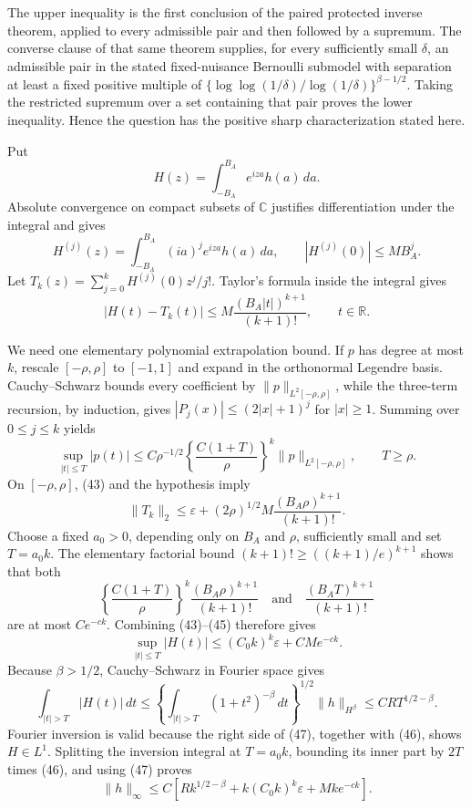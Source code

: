 The upper inequality is the first conclusion of the paired protected inverse theorem, applied to every admissible pair and then followed by a supremum.  The converse clause of that same theorem supplies, for every sufficiently small \(\delta\), an admissible pair in the stated fixed-nuisance Bernoulli submodel with separation at least a fixed positive multiple of \(\{\log\log(1/\delta)/\log(1/\delta)\}^{\beta-1/2}\).  Taking the restricted supremum over a set containing that pair proves the lower inequality.  Hence the question has the positive sharp characterization stated here.

Put
\[
H(z)=\int_{-B_A}^{B_A}e^{iza}h(a)\,da.
\]
Absolute convergence on compact subsets of \(\mathbb C\) justifies differentiation under the integral and gives
\[
H^{(j)}(z)=\int_{-B_A}^{B_A}(ia)^je^{iza}h(a)\,da,
\qquad |H^{(j)}(0)|\le MB_A^j. \tag{42}
\]
Let \(T_k(z)=\sum_{j=0}^kH^{(j)}(0)z^j/j!\).  Taylor's formula inside the integral gives
\[
|H(t)-T_k(t)|
\le M\frac{(B_A|t|)^{k+1}}{(k+1)!},
\qquad t\in\mathbb R. \tag{43}
\]

We need one elementary polynomial extrapolation bound.  If \(p\) has degree at most \(k\), rescale \([-\rho,\rho]\) to \([-1,1]\) and expand in the orthonormal Legendre basis.  Cauchy--Schwarz bounds every coefficient by \(\|p\|_{L^2[-\rho,\rho]}\), while the three-term recursion, by induction, gives \(|P_j(x)|\le(2|x|+1)^j\) for \(|x|\ge1\).  Summing over \(0\le j\le k\) yields
\[
\sup_{|t|\le T}|p(t)|
\le C\rho^{-1/2}
\left\{\frac{C(1+T)}{\rho}\right\}^k
\|p\|_{L^2[-\rho,\rho]},
\qquad T\ge\rho. \tag{44}
\]
On \([-\rho,\rho]\), (43) and the hypothesis imply
\[
\|T_k\|_2
\le\varepsilon+(2\rho)^{1/2}M
\frac{(B_A\rho)^{k+1}}{(k+1)!}. \tag{45}
\]
Choose a fixed \(a_0>0\), depending only on \(B_A\) and \(\rho\), sufficiently small and set \(T=a_0k\).  The elementary factorial bound \((k+1)!\ge((k+1)/e)^{k+1}\) shows that both
\[
\left\{\frac{C(1+T)}{\rho}\right\}^k
\frac{(B_A\rho)^{k+1}}{(k+1)!}
\quad\text{and}\quad
\frac{(B_AT)^{k+1}}{(k+1)!}
\]
are at most \(Ce^{-ck}\).  Combining (43)--(45) therefore gives
\[
\sup_{|t|\le T}|H(t)|
\le (C_0k)^k\varepsilon+CMe^{-ck}. \tag{46}
\]
Because \(\beta>1/2\), Cauchy--Schwarz in Fourier space gives
\[
\int_{|t|>T}|H(t)|\,dt
\le
\left\{\int_{|t|>T}(1+t^2)^{-\beta}\,dt\right\}^{1/2}
\|h\|_{H^\beta}
\le CRT^{1/2-\beta}. \tag{47}
\]
Fourier inversion is valid because the right side of (47), together with (46), shows \(H\in L^1\).  Splitting the inversion integral at \(T=a_0k\), bounding its inner part by \(2T\) times (46), and using (47) proves
\[
\|h\|_\infty
\le C\left[Rk^{1/2-\beta}
+k(C_0k)^k\varepsilon+Mk e^{-ck}\right]. \tag{48}
\]

